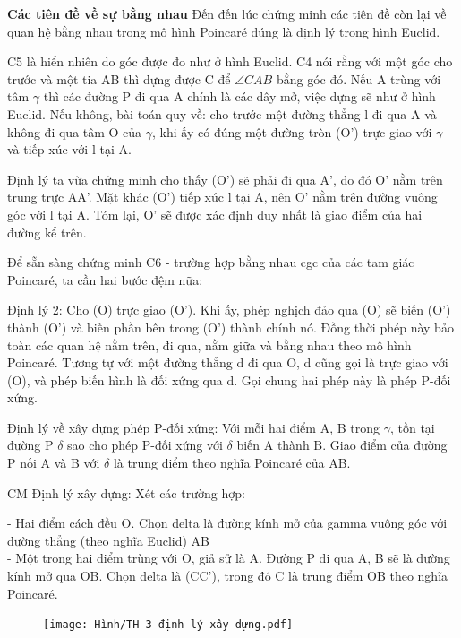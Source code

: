 \begin{multicols}{2}
	\textbf{\color{lichsutoanhoc}Các tiên đề về sự bằng nhau}
	Đến đến lúc chứng minh các tiên đề còn lại về quan hệ bằng nhau trong mô hình Poincaré đúng là định lý trong hình Euclid.
	
	C5 là hiển nhiên do góc được đo như ở hình Euclid. C4 nói rằng với một góc cho trước và một tia AB thì dựng được C để $ \angle CAB$ bằng góc đó. Nếu A trùng với tâm $ \gamma$ thì các đường P đi qua A chính là các dây mở, việc dựng sẽ như ở hình Euclid.
	Nếu không, bài toán quy về: cho trước một đường thẳng l đi qua A và không đi qua tâm O của $\gamma$, khi ấy có đúng một đường tròn (O') trực giao với $\gamma$ và tiếp xúc với l tại A. 
	
	Định lý ta vừa chứng minh cho thấy (O') sẽ phải đi qua A', do đó O' nằm trên trung trực AA'. Mặt khác (O') tiếp xúc l tại A, nên O' nằm trên đường vuông góc với l tại A. Tóm lại, O' sẽ được xác định duy nhất là giao điểm của hai đường kể trên.
	
	Để sẵn sàng chứng minh C6 - trường hợp bằng nhau cgc của các tam giác Poincaré, ta cần hai bước đệm nữa:
	
	Định lý 2: Cho (O) trực giao (O'). Khi ấy, phép nghịch đảo qua (O) sẽ biến (O') thành (O') và biến phần bên trong (O') thành chính nó. Đồng thời phép này bảo toàn các quan hệ nằm trên, đi qua, nằm giữa và bằng nhau theo mô hình Poincaré. Tương tự với một đường thẳng d đi qua O,  d cũng gọi là trực giao với (O), và phép biến hình là đối xứng qua d. Gọi chung hai phép này là phép P-đối xứng.
	
	Định lý về xây dựng phép P-đối xứng: Với mỗi hai điểm A, B trong $\gamma$, tồn tại đường P $\delta$ sao cho phép P-đối xứng với $\delta$ biến A thành B. Giao điểm của đường P nối A và B với $\delta$ là trung điểm theo nghĩa Poincaré của AB.
	
	
	
	CM Định lý xây dựng: Xét các trường hợp:
	
	- Hai điểm cách đều O. Chọn delta là đường kính mở của gamma vuông góc với đường thẳng (theo nghĩa Euclid) AB \\
	- Một trong hai điểm trùng với O, giả sử là A. Đường P đi qua A, B sẽ là đường kính mở qua OB. Chọn delta là (CC'), trong đó C là trung điểm OB theo nghĩa Poincaré. \\
	
	\begin{figure}[ht]
		\texttt{[image: Hình/TH 3 định lý xây dựng.pdf]}
	\end{figure}
	

\end{multicols}
